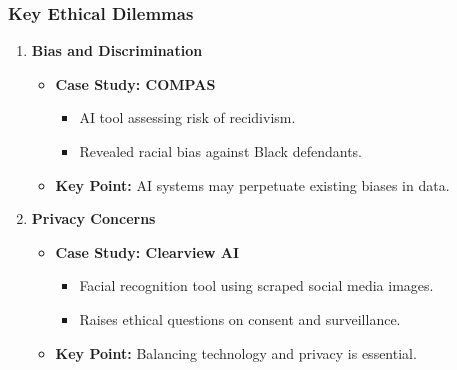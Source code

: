 \documentclass{beamer}
\begin{document}
\begin{frame}[fragile]
    \frametitle{Key Ethical Dilemmas}
    \begin{enumerate}
        \item \textbf{Bias and Discrimination}
            \begin{itemize}
                \item \textbf{Case Study: COMPAS}
                \begin{itemize}
                    \item AI tool assessing risk of recidivism.
                    \item Revealed racial bias against Black defendants.
                \end{itemize}
                \item \textbf{Key Point:} AI systems may perpetuate existing biases in data.
            \end{itemize}
        
        \item \textbf{Privacy Concerns}
            \begin{itemize}
                \item \textbf{Case Study: Clearview AI}
                \begin{itemize}
                    \item Facial recognition tool using scraped social media images.
                    \item Raises ethical questions on consent and surveillance.
                \end{itemize}
                \item \textbf{Key Point:} Balancing technology and privacy is essential.
            \end{itemize}
    \end{enumerate}
\end{frame}
\end{document}
